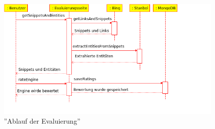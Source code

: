 \begin{figure}
\centering
\includegraphics[width=1\textwidth]{Bilder/eval_sequence.png}
\caption{''Ablauf der Evaluierung''}
\label{fig:eval-ablauf}
\end{figure}

